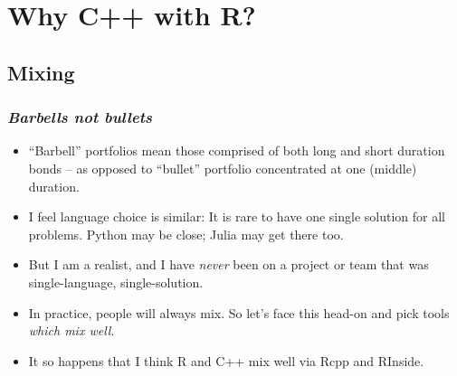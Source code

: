 \documentclass[dvipsnames,handout,compress,pdflatex,beamer]{beamer}
\begin{document}
\section[With R]{Why C++ with R?}
\subsection{Mixing}
\begin{frame}
  \frametitle{\textsl{Barbells not bullets}}
  \begin{itemize}[<+->]
  \item ``Barbell'' portfolios mean those comprised of both long and short
    duration bonds -- as opposed to ``bullet'' portfolio concentrated at one
    (middle) duration. 
  \item I feel language choice is similar:  It is rare to have one single
    solution for all problems. Python may be close;  Julia may get there too.
  \item But I am a realist, and I have \emph{never} been on a project or
    team that was single-language, single-solution.
  \item In practice, people will always mix.  %
    So let's face this head-on and pick tools \emph{which mix well}.  
  \item It so happens that I think R and C++ mix well via Rcpp and RInside.
  \end{itemize}
\end{frame}
\end{document}
